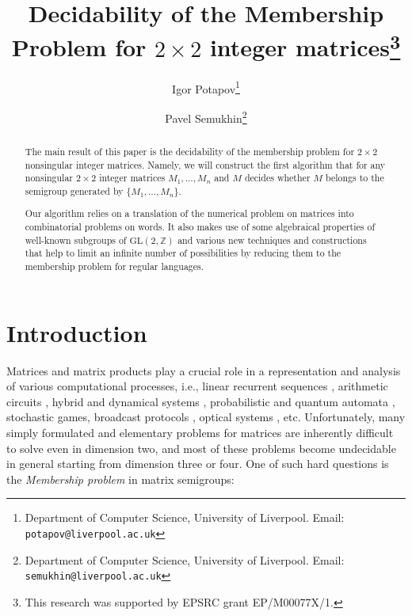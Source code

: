 \documentclass[fontsize=11pt,DIV=13,paper=letter]{scrartcl}
\theoremstyle{definition}
\newcommand{\Z}{\mathbb{Z}}
\newcommand{\GL}{\mathrm{GL}(2,\Z)}
\begin{document}
\title{\Large Decidability of the Membership Problem for $2\times 2$ integer matrices\thanks{This research was supported by EPSRC grant EP/M00077X/1.}}

\author{\large Igor Potapov\thanks{Department of Computer Science, University of Liverpool. Email: {\tt potapov@liverpool.ac.uk}}
\and \large Pavel Semukhin\thanks{Department of Computer Science, University of Liverpool. Email: {\tt semukhin@liverpool.ac.uk}}}
\date{}

\maketitle

\begin{abstract}
The main result of this paper is the decidability of the membership problem for $2\times 2$ nonsingular integer matrices. Namely, we will construct the first algorithm that for any nonsingular $2\times 2$ integer matrices $M_1,\dots,M_n$ and $M$ decides whether $M$ belongs to the semigroup generated by $\{M_1,\dots,M_n\}$.

Our algorithm relies on a translation of the numerical problem on matrices into combinatorial problems on words. It also makes use of some algebraical properties of well-known subgroups of $\GL$ and various new techniques and constructions that help to limit an infinite number of possibilities by reducing them to the membership problem for regular languages.
\end{abstract}

\section{Introduction}
Matrices and matrix products play a crucial role in a representation and analysis of various computational processes, 
i.e., linear recurrent sequences \cite{tHaHaHiKa05a,OW_ICALP2015-1,OW_ICALP2015-2}, arithmetic circuits \cite{GOW_STACS2015}, 
hybrid and dynamical systems \cite{OSW2015, BP2008},
probabilistic and quantum automata \cite{Blondel2005}, stochastic
games, broadcast protocols \cite{EFM1999},  optical systems \cite{GB94}, etc. 
Unfortunately, many simply formulated and elementary problems for matrices are inherently difficult to solve
even in dimension two, and most of these problems 
become undecidable in general starting from dimension three or four.
One of such hard questions is the {\sl Membership problem} in matrix semigroups:\\
\end{document}
